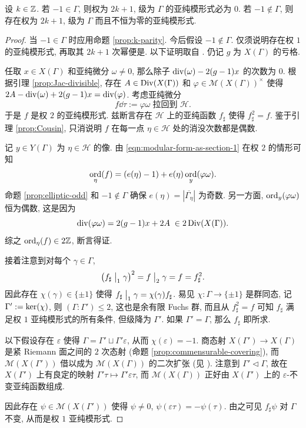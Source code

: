 \begin{theorem}\label{prop:existence-meromorphic-odd}
	设 $k \in \mathbb{Z}$. 若 $-1 \in \Gamma$, 则权为 $2k+1$, 级为 $\Gamma$ 的亚纯模形式必为 $0$. 若 $-1 \notin \Gamma$, 则存在权为 $2k+1$, 级为 $\Gamma$ 而且不恒为零的亚纯模形式.
\end{theorem}
\begin{proof}
	当 $-1 \in \Gamma$ 时应用命题 \ref{prop:k-parity}. 今后假设 $-1 \notin \Gamma$. 仅须说明存在权 $1$ 的亚纯模形式, 再取其 $2k+1$ 次幂便是. 以下证明取自 \cite[p.40]{Shi71}. 仍记 $g$ 为 $X(\Gamma)$ 的亏格.

	任取 $x \in X(\Gamma)$ 和亚纯微分 $\omega \neq 0$, 那么除子 $\operatorname{div}(\omega) - 2(g-1)x$ 的次数为 $0$. 根据引理 \ref{prop:Jac-divisible}, 存在 $A \in \operatorname{Div}(X(\Gamma))$ 和 $\varphi \in \mathcal{M}(X(\Gamma))^\times$ 使得 $2A - \operatorname{div}(\omega) + 2(g-1)x = \operatorname{div}(\varphi)$. 考虑亚纯微分
	\[ f\dd\tau := \varphi \omega \; \text{拉回到 $\mathcal{H}$}. \]
	于是 $f$ 是权 $2$ 的亚纯模形式. 兹断言存在 $\mathcal{H}$ 上的亚纯函数 $f_\sharp$ 使得 $f_\sharp^2 = f$. 鉴于引理 \ref{prop:Cousin}, 只消说明 $f$ 在每一点 $\eta \in \mathcal{H}$ 处的消没次数都是偶数.
	
	记 $y \in Y(\Gamma)$ 为 $\eta \in \mathcal{H}$ 的像. 由 \eqref{eqn:modular-form-as-section-1} 在权 $2$ 的情形可知
	\[ \operatorname*{ord}_\eta(f) = (e(\eta)-1) + e(\eta) \operatorname*{ord}_y(\varphi\omega). \]
	命题 \ref{prop:elliptic-odd} 和 $-1 \notin \Gamma$ 确保 $e(\eta) = \left| \overline{\Gamma_\eta} \right|$ 为奇数. 另一方面, $\operatorname*{ord}_y(\varphi\omega)$ 恒为偶数, 这是因为
	\[ \operatorname{div}(\varphi\omega) = 2(g-1)x + 2A \; \in 2\operatorname{Div}(X(\Gamma)). \]
	综之 $\operatorname*{ord}_\eta(f) \in 2\mathbb{Z}$, 断言得证.
	
	接着注意到对每个 $\gamma \in \Gamma$,
	\[ \left( f_\sharp \;\big|_{1} \; \gamma \right)^2 = f \;\big|_{2} \; \gamma = f = f_\sharp^2. \]
	因此存在 $\chi(\gamma) \in \{\pm 1\}$ 使得 $f_\sharp \;\big|_{1} \; \gamma = \chi(\gamma) f_\sharp$. 易见 $\chi: \Gamma \to \{\pm 1\}$ 是群同态, 记 $\Gamma' := \operatorname{ker}(\chi)$, 则 $(\Gamma:\Gamma') \leq 2$, 这也是余有限 Fuchs 群, 而且从 $f_\sharp^2 = f$ 可知 $f_\sharp$ 满足权 $1$ 亚纯模形式的所有条件, 但级降为 $\Gamma'$. 如果 $\Gamma' = \Gamma$, 那么 $f_\sharp$ 即所求.
	
	以下假设存在 $\varepsilon$ 使得 $\Gamma = \Gamma' \sqcup \Gamma' \varepsilon$, 从而 $\chi(\varepsilon) = -1$. 商态射 $X(\Gamma') \to X(\Gamma)$ 是紧 Riemann 面之间的 $2$ 次态射 (命题 \ref{prop:commensurable-covering}), 而 $\mathcal{M}(X(\Gamma'))$ 借以成为 $\mathcal{M}(X(\Gamma))$ 的二次扩张 (见 \cite[定理 3.4.7]{Mei13}). 注意到 $\Gamma' \lhd \Gamma$, 故在 $X(\Gamma')$ 上有良定的映射 $\Gamma'\tau \mapsto \Gamma'\varepsilon\tau$, 而 $\mathcal{M}(X(\Gamma))$ 正好由 $X(\Gamma')$ 上的 $\varepsilon$-不变亚纯函数组成.
	
	因此存在 $\psi \in \mathcal{M}(X(\Gamma'))$ 使得 $\psi \neq 0$, $\psi(\varepsilon\tau) = -\psi(\tau)$. 由之可见 $f_\sharp \psi$ 对 $\Gamma$ 不变, 从而是权 $1$ 亚纯模形式.
\end{proof}


